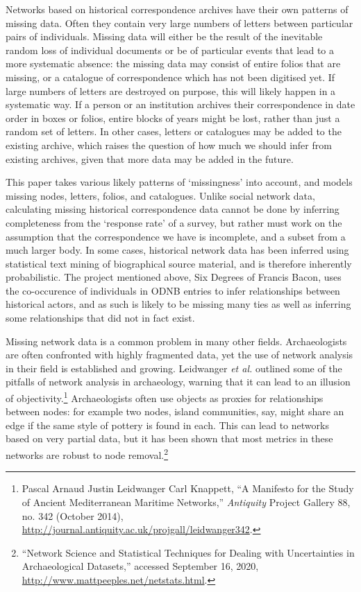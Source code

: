 \documentclass[]{article}
\begin{document}
Networks based on historical correspondence archives have their own patterns of missing data. Often they contain very large numbers of letters between particular pairs of individuals. Missing data will either be the result of the inevitable random loss of individual documents or be of particular events that lead to a more systematic absence: the missing data may consist of entire folios that are missing, or a catalogue of correspondence which has not been digitised yet. If large numbers of letters are destroyed on purpose, this will likely happen in a systematic way. If a person or an institution archives their correspondence in date order in boxes or folios, entire blocks of years might be lost, rather than just a random set of letters. In other cases, letters or catalogues may be added to the existing archive, which raises the question of how much we should infer from existing archives, given that more data may be added in the future.

This paper takes various likely patterns of `missingness' into account, and models missing nodes, letters, folios, and catalogues. Unlike social network data, calculating missing historical correspondence data cannot be done by inferring completeness from the `response rate' of a survey, but rather must work on the assumption that the correspondence we have is incomplete, and a subset from a much larger body. In some cases, historical network data has been inferred using statistical text mining of biographical source material, and is therefore inherently probabilistic. The project mentioned above, Six Degrees of Francis Bacon, uses the co-occurence of individuals in ODNB entries to infer relationships between historical actors, and as such is likely to be missing many ties as well as inferring some relationships that did not in fact exist.

Missing network data is a common problem in many other fields. Archaeologists are often confronted with highly fragmented data, yet the use of network analysis in their field is established and growing. Leidwanger \emph{et al.} outlined some of the pitfalls of network analysis in archaeology, warning that it can lead to an illusion of objectivity.\footnote{Pascal Arnaud Justin Leidwanger Carl Knappett, ``A Manifesto for the Study of Ancient Mediterranean Maritime Networks,'' \emph{Antiquity} Project Gallery 88, no. 342 (October 2014), \url{http://journal.antiquity.ac.uk/projgall/leidwanger342}.} Archaeologists often use objects as proxies for relationships between nodes: for example two nodes, island communities, say, might share an edge if the same style of pottery is found in each. This can lead to networks based on very partial data, but it has been shown that most metrics in these networks are robust to node removal.\footnote{``Network Science and Statistical Techniques for Dealing with Uncertainties in Archaeological Datasets,'' accessed September 16, 2020, \url{http://www.mattpeeples.net/netstats.html}.}
\end{document}
